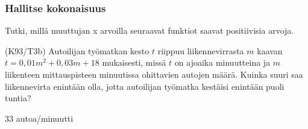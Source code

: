 \begin{tehtavasivu}
%


\subsubsection*{Hallitse kokonaisuus}

\begin{tehtava}
  Tutki, millä muuttujan x arvoilla seuraavat funktiot saavat positiivisia arvoja.
  \begin{alakohdat}
  \end{alakohdat}

  \begin{vastaus}
    \begin{alakohdat}
    \end{alakohdat}
  \end{vastaus}
\end{tehtava}

\begin{tehtava}
(K93/T3b) Autoilijan työmatkan kesto $t$ riippuu liikennevirrasta $m$ kaavan $t=0,01m^2+0,03m+18$ mukaisesti, missä $t$ on ajoaika minuutteina ja $m$ liikenteen mittauspisteen minuutissa ohittavien autojen määrä. Kuinka suuri saa liikennevirta enintään olla, jotta autoilijan työmatka kestäisi enintään puoli tuntia?
\begin{vastaus}
        $33$ autoa/minuutti
    \end{vastaus}
\end{tehtava}


\end{tehtavasivu}
